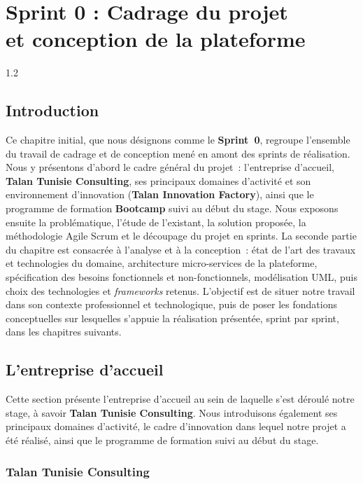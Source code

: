         \chapter[Sprint 0 : Cadrage et conception]{Sprint 0 : Cadrage du projet\\et conception de la plateforme}
        \label{ch:sprint0}
        \begin{spacing}{1.2}
        \minitoc%
            \thispagestyle{MyStyle}
        \end{spacing}
        \clearpage
        
        \section*{Introduction}
        Ce chapitre initial, que nous désignons comme le \textbf{Sprint~0}, regroupe l’ensemble du travail de cadrage et de conception mené en amont des sprints de réalisation. Nous y présentons d’abord le cadre général du projet~: l’entreprise d’accueil, \textbf{Talan Tunisie Consulting}, ses principaux domaines d’activité et son environnement d’innovation (\textbf{Talan Innovation Factory}), ainsi que le programme de formation \textbf{Bootcamp} suivi au début du stage. Nous exposons ensuite la problématique, l’étude de l’existant, la solution proposée, la méthodologie Agile Scrum et le découpage du projet en sprints. La seconde partie du chapitre est consacrée à l’analyse et à la conception~: état de l’art des travaux et technologies du domaine, architecture micro-services de la plateforme, spécification des besoins fonctionnels et non-fonctionnels, modélisation UML, puis choix des technologies et \textit{frameworks} retenus. L’objectif est de situer notre travail dans son contexte professionnel et technologique, puis de poser les fondations conceptuelles sur lesquelles s’appuie la réalisation présentée, sprint par sprint, dans les chapitres suivants.
        
        \section{L’entreprise d’accueil}

        Cette section présente l’entreprise d’accueil au sein de laquelle s’est déroulé notre stage, à savoir \textbf{Talan Tunisie Consulting}. Nous introduisons également ses principaux domaines d’activité, le cadre d’innovation dans lequel notre projet a été réalisé, ainsi que le programme de formation suivi au début du stage.
        \subsection{Talan Tunisie Consulting}
        
